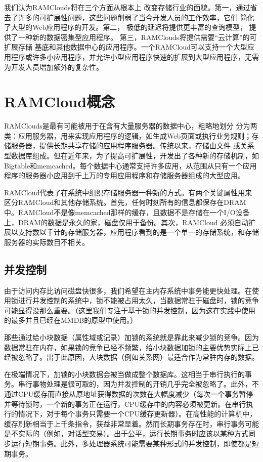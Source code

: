 \documentclass[translation]{zjutreport}
\begin{document}
我们认为RAMClouds将在三个方面从根本上
改变存储行业的面貌。第一，通过省去了许多的可扩展性问题，这些问题削弱了当今开发人员的工作效率，它们
简化了大型的Web应用程序的开发。第二，
极低的延迟将提供更丰富的查询模型，
提供了一种新的数据密集型应用程序。
第三，RAMClouds将提供需要“云计算”的可扩展存储
基底和其他数据中心的应用程序。一个RAMCloud可以支持一个大型应用程序或许多小应用程序，并允许小型应用程序快速的扩展到大型应用程序，无需为开发人员增加额外的复杂性。


\chapter{RAMCloud概念}
RAMClouds是最有可能被用于在含有大量服务器的数据中心，粗略地划分
分为两类：应用服务器，用来实现应用程序的逻辑，如生成Web页面或执行业务规则；存储服务器，提供长期共享存储的应用程序服务器。传统以来，存储由文件
或关系型数据库组成。但在近年来，为了提高可扩展性，开发出了各种新的存储机制，如Bigtable和memcached。每个数据中心通常支持许多应用，从范围从只有一个应用程序的服务器小应用到千上万的专用应用程序和存储服务器组成的大型应用。

RAMCloud代表了在系统中组织存储服务器一种新的方式。有两个关键属性用来区分RAMCloud和其他存储系统。首先，任何时刻所有的信息都保存在DRAM中。RAMCloud不是像memcached那样的缓存，且数据不是存储在一个I/O设备上，DRAM的数据是永久的家，磁盘仅用于备份。其次，RAMCloud
必须自动扩展以支持数以千计的存储服务器，应用程序看到的是一个单一的存储系统，和存储服务器的实际数目不相关。

\section{并发控制}
由于访问内存比访问磁盘快很多，我们希望在主内存系统中事务能更快处理。在使用锁进行并发控制的系统中，锁不能被占用太久，当数据常驻于磁盘时，锁的竞争可能显得没那么重要。（这里我们专注于基于锁的并发控制，因为这在实践中使用的最多并且已经在MMDB的原型中使用。）

那些通过给小块数据（属性域或记录）加锁的系统就是靠此来减少锁的竞争。因为数据常驻在内存，如果锁的竞争已经不频繁，给小块数据加锁的主要优势实际上已经被忽略了。出于此原因，大块数据（例如关系网）最适合作为常驻内存的数据。

在极端情况下，加锁的小块数据会被当做成整个数据库。这相当于串行执行的事务。串行事物处理是很可取的，因为并发控制的开销几乎完全被忽略了。此外，不通过CPU缓存而直接从原地址获得数据的次数在大幅度减少（每次一个事务暂停并等待锁时，一个新的事务正在运行，CPU缓存中的内容必须被更新。在串行执行的情况下，对于每个事务只需要一个CPU缓存更新器）。在高性能的计算机中，缓存刷新相当于上千条指令，获益非常显着。然而长期事务存在时，串行事务可能是不实际的（例如，对话型交易）。出于公平，运行长期事务时应该以某种方式同步运行短期事务。此外，多处理器系统可能需要某种形式的并发控制，即使都是短期事务。
\end{document}
